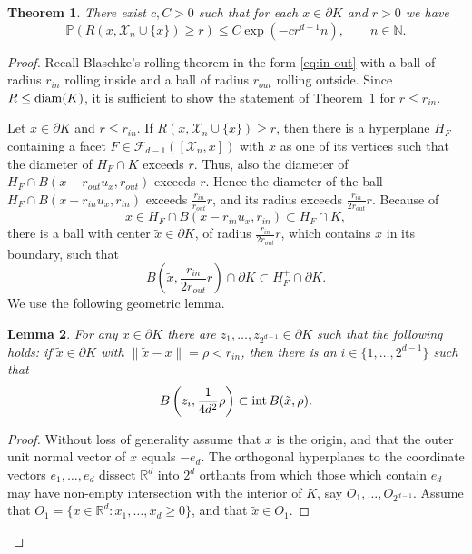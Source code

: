 \documentclass[12pt]{article}
\newcommand{\IN}{\mathds{N}}
\def\P{{\mathds{P}}}
\def\R{{\mathds{R}}}
\def\cF{{\mathcal F}}
\def\cX{{\mathcal X}}
\def\bd{{\partial}}
\newtheorem{theorem}{Theorem}[section]
\newtheorem{lemma}[theorem]{Lemma}
\theoremstyle{definition}
\begin{document}
\begin{theorem}\label{th:rad_influence}
There exist $c,C>0$ such that for each $x \in \bd K$ and $r>0$ we have
$$
\P( R(x, \cX_{n} \cup\{x\}) \geq r)
\leq
C \exp(- c r^{d-1} n),\qquad n\in \IN. 
$$
\end{theorem}
\begin{proof}
	Recall Blaschke's rolling theorem in the form \eqref{eq:in-out} with a ball of radius $r_{in}$ rolling inside and a ball of radius $r_{out}$ rolling outside. Since $R\le {\rm diam}(K)$, it is sufficient to show the statement of Theorem~\ref{th:rad_influence} for $r\le r_{in}$.

	Let $x\in \bd K$ and $r\le r_{in}$. If $R(x, \cX_n\cup \{x\}) \geq r$, then there is a hyperplane $H_F$ containing a facet $F \in \cF_{d-1}([\cX_n,x])$ with $x$ as one of its vertices such that the diameter of $H_F \cap K$ exceeds $r$. Thus, also the diameter of $H_F \cap B(x-r_{out} u_x, r_{out})$ exceeds $r$. Hence the diameter of the ball $H_F \cap B(x-r_{in} u_x, r_{in})$ exceeds $\frac{r_{in}}{r_{out}} r$, and its radius exceeds $\frac{r_{in}}{2r_{out}} r$. 
Because of
$$ x \in H_F \cap B(x-r_{in} u_x, r_{in}) \subset H_F \cap K , $$
there is a ball with center $\tilde x \in \bd K$, of radius $\frac{r_{in}}{2r_{out}} r$, which contains $x$ in its boundary, such that 
\begin{equation}\label{eq:cap_ball}
B\left(\tilde x, \frac{r_{in}}{2r_{out}} r \right) \cap \bd K \subset H_F^+ \cap \bd K 
.
\end{equation}
We use the following geometric lemma.
\begin{lemma}\label{le:points_cover}
For any $x  \in \bd K$ there are $z_1, \dots , z_{2^{d-1}} \in \bd K$ such that the following holds:
if $\tilde x \in \bd K$ with $\|\tilde x -  x\| = \rho < r_{in}$, then there is an $i \in \{1, \dots , 2^{d-1}\}$ such that 
$$ B\left(z_i, \frac 1{4d^2} \rho \right) \subset {\rm int}\, B(\tilde x, \rho) . $$ 
\end{lemma}
\begin{proof}
Without loss of generality assume that $x$ is the origin, and that the outer unit normal vector of $x$ equals $-e_d$. The orthogonal hyperplanes to the coordinate vectors $e_1, \dots, e_{d}$ dissect $\R^d$ into $2^d$ orthants from which those which contain $e_d$ may have non-empty intersection with the interior of $K$, say $O_1, \dots,  O_{2^{d-1}}$.
Assume that $O_1 = \{x \in \R^d \colon x_1, \dots, x_d \geq 0 \}$, and that $\tilde x \in O_1$. 


\end{proof}
\end{proof}
\end{document}
